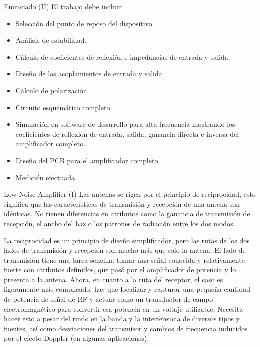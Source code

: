 \documentclass[9pt]{beamer}
\begin{document}
	\begin{frame}{Enunciado (II)}
		El trabajo debe incluir:
		\begin{itemize}
			\item Selección del punto de reposo del dispositivo.
			\item Análisis de estabilidad.
			\item Cálculo de coeficientes de reflexión e impedancias de entrada y salida.
			\item Diseño de los acoplamientos de entrada y salida.
			\item Cálculo de polarización.
			\item Circuito esquemático completo.
			\item Simulación en software de desarrollo para alta frecuencia mostrando los coeficientes de reflexión de entrada, salida, ganancia directa e inversa del amplificador completo.
			\item Diseño del PCB para el amplificador completo.
			\item Medición efectuada.
		\end{itemize}
	\end{frame}
	
	\begin{frame}{Low Noise Amplifier (I)}
		Las antenas se rigen por el principio de reciprocidad, esto significa que las características de transmisión y recepción de una antena son idénticas. No tienen diferencias en atributos como la ganancia de transmisión de recepción, el ancho del haz o los patrones de radiación entre los dos modos. 
		
		La reciprocidad es un principio de diseño simplificador, pero las rutas de los dos lados de transmisión y recepción son mucho más que solo la antena. El lado de transmisión tiene una tarea sencilla: tomar una señal conocida y relativamente fuerte con atributos definidos, que pasó por el amplificador de potencia y lo presenta a la antena. Ahora, en cuanto a la ruta del receptor, el caso es ligeramente más complicado, hay que localizar y capturar una pequeña cantidad de potencia de señal de RF y actuar como un transductor de campo electromagnético para convertir esa potencia en un voltaje utilizable. Necesita hacer esto a pesar del ruido en la banda y la interferencia de diversos tipos y fuentes, así como desviaciones del transmisor y cambios de frecuencia inducidos por el efecto Doppler (en algunas aplicaciones).
	\end{frame}	
		
\end{document}
